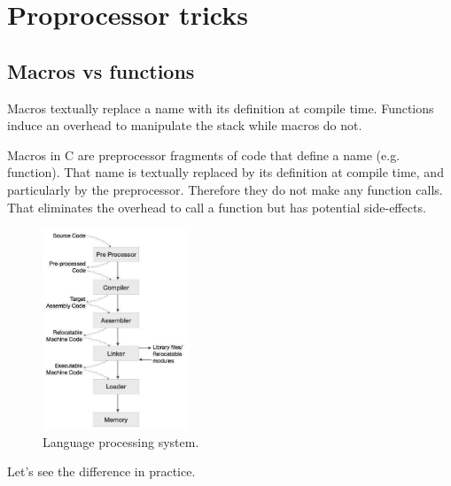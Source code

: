 \section{Proprocessor tricks}

\subsection{Macros vs functions}

\begin{takeaway}
Macros textually replace a name with its definition at compile time. Functions induce an overhead to manipulate the stack while macros do not.
\end{takeaway}

Macros in C are preprocessor fragments of code that define a name (e.g. function). That name is textually replaced by its definition at compile time, and particularly by the preprocessor. Therefore they do not make any function calls. That eliminates the overhead to call a function but has potential side-effects.

\begin{figure}[H]
    \centering
    \includegraphics[height=6cm]{img/preprocessor_tricks/language_processing_system.jpg}
    \caption{Language processing system.}
\end{figure}

Let's see the difference in practice. 



